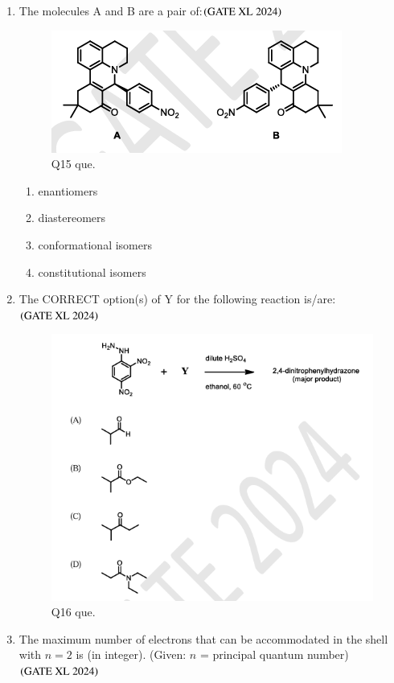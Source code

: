 \documentclass[journal]{IEEEtran}
\begin{document}
\begin{enumerate}
    \item The molecules A and B are a pair of:\hfill $\left(\text{GATE XL 2024}\right)$
    \begin{figure}[H]
        \centering
        \includegraphics[width=0.5\columnwidth]{figs/xl2024_q15_que.png}
        \caption{Q15 que.}
    \end{figure}
    \begin{enumerate}
            \item enantiomers
            \item diastereomers
            \item conformational isomers
            \item constitutional isomers
    \end{enumerate}

    \item The CORRECT option(s) of Y for the following reaction is/are:\hfill $\left(\text{GATE XL 2024}\right)$
    \begin{figure}[H]
        \centering
        \includegraphics[width=0.8\columnwidth]{figs/xl2024_q16_que.png}
        \caption{Q16 que.}
    \end{figure}

    \item The maximum number of electrons that can be accommodated in the shell with $n = 2$ is (in integer).  
    (Given: $n$ = principal quantum number)\hfill $\left(\text{GATE XL 2024}\right)$


\end{enumerate}
\end{document}
